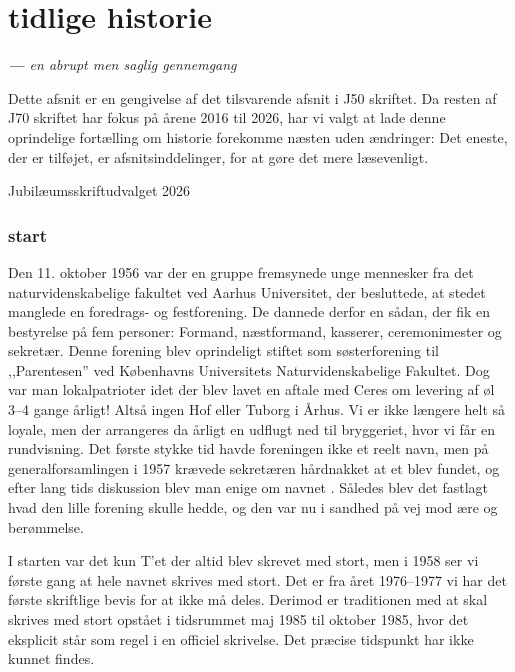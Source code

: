\chapter{\TKETs tidlige historie}
\vspace{-0.2cm}
\textit{\textbf{---} en abrupt men saglig gennemgang}
\vspace{6pt}

\noindent Dette afsnit er en gengivelse af det tilsvarende afsnit i J50 skriftet. Da resten af J70 skriftet har fokus på årene 2016 til 2026, har vi valgt at lade denne oprindelige fortælling om \TKETs historie forekomme næsten uden ændringer: Det eneste, der er tilføjet, er afsnitsinddelinger, for at gøre det mere læsevenligt.
\begin{flushright}
    Jubilæumsskriftudvalget 2026
\end{flushright}

\subsection{\TKETs start}
\noindent Den 11. oktober 1956 var der en gruppe fremsynede unge mennesker fra det naturvidenskabelige fakultet ved Aarhus Universitet, der besluttede, at stedet manglede en foredrags- og festforening. De dannede derfor en sådan, der fik en bestyrelse på fem personer: Formand, næstformand, kasserer, ceremonimester og sekretær. Denne forening blev oprindeligt stiftet som søsterforening til ,,Parentesen'' ved Københavns Universitets Naturvidenskabelige Fakultet. Dog var man lokalpatrioter idet der blev lavet en aftale med Ceres om levering af øl 3--4 gange årligt! Altså ingen Hof eller Tuborg i Århus. Vi er ikke længere helt så loyale, men der arrangeres da årligt en udflugt ned til bryggeriet, hvor vi får en rundvisning. Det første stykke tid havde foreningen ikke et reelt navn, men på generalforsamlingen i 1957 krævede sekretæren hårdnakket at et blev fundet, og efter lang tids diskussion blev man enige om navnet \TKET. Således blev det fastlagt hvad den lille forening skulle hedde, og den var nu i sandhed på vej mod ære og berømmelse.

I starten var det kun T'et der altid blev skrevet med stort, men i 1958 ser vi første gang at hele navnet skrives med stort. Det er fra året 1976--1977 vi har det første skriftlige bevis for at \TKET ikke må deles. Derimod er traditionen med at \TKET skal skrives med stort opstået i tidsrummet maj 1985 til oktober 1985, hvor det eksplicit står som regel i en officiel skrivelse. Det præcise tidspunkt har ikke kunnet findes.

